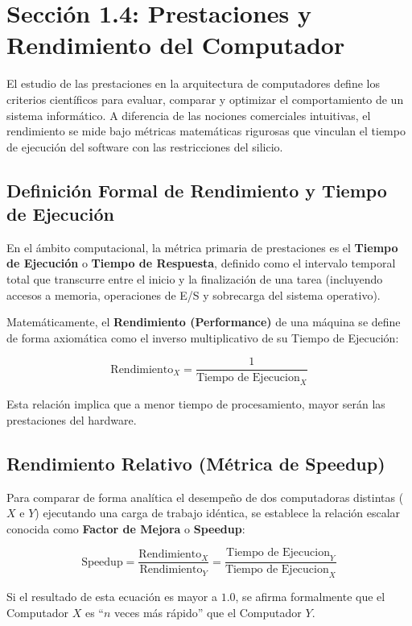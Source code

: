 \documentclass[12pt,letterpaper]{article}
\begin{document}
\section{Sección 1.4: Prestaciones y Rendimiento del Computador}
El estudio de las prestaciones en la arquitectura de computadores define los criterios científicos para evaluar, comparar y optimizar el comportamiento de un sistema informático. A diferencia de las nociones comerciales intuitivas, el rendimiento se mide bajo métricas matemáticas rigurosas que vinculan el tiempo de ejecución del software con las restricciones del silicio.

\subsection{Definición Formal de Rendimiento y Tiempo de Ejecución}
En el ámbito computacional, la métrica primaria de prestaciones es el \textbf{Tiempo de Ejecución} o \textbf{Tiempo de Respuesta}, definido como el intervalo temporal total que transcurre entre el inicio y la finalización de una tarea (incluyendo accesos a memoria, operaciones de E/S y sobrecarga del sistema operativo).

Matemáticamente, el \textbf{Rendimiento (Performance)} de una máquina se define de forma axiomática como el inverso multiplicativo de su Tiempo de Ejecución:

\begin{equation}
\text{Rendimiento}_X = \frac{1}{\text{Tiempo de Ejecucion}_X}
\end{equation}

Esta relación implica que a menor tiempo de procesamiento, mayor serán las prestaciones del hardware.

\subsection{Rendimiento Relativo (Métrica de Speedup)}
Para comparar de forma analítica el desempeño de dos computadoras distintas ($X$ e $Y$) ejecutando una carga de trabajo idéntica, se establece la relación escalar conocida como \textbf{Factor de Mejora} o \textbf{Speedup}:

\begin{equation}
\text{Speedup} = \frac{\text{Rendimiento}_X}{\text{Rendimiento}_Y} = \frac{\text{Tiempo de Ejecucion}_Y}{\text{Tiempo de Ejecucion}_X}
\end{equation}

Si el resultado de esta ecuación es mayor a $1.0$, se afirma formalmente que el Computador $X$ es ``$n$ veces más rápido'' que el Computador $Y$.
\end{document}
